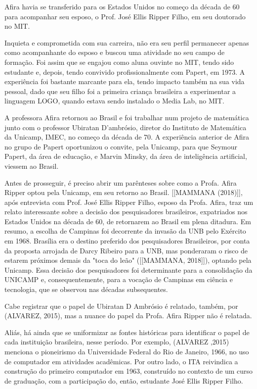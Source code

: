 Afira havia se transferido para os Estados Unidos no começo da década de 60 para acompanhar seu esposo, o Prof. José Ellis Ripper Filho, em seu doutorado no MIT.

Inquieta e comprometida com sua carreira, não era seu perfil permanecer apenas como acompanhante do esposo e buscou uma atividade no seu campo de formação. Foi assim que se engajou como aluna ouvinte no MIT, tendo sido estudante e, depois, tendo convivido profissionalmente com Papert, em 1973. A experiência foi bastante marcante para ela, tendo impacto também na sua vida pessoal, dado que seu filho foi a primeira criança brasileira a experimentar a linguagem LOGO, quando estava sendo instalado o Media Lab, no MIT.

A professora Afira retornou ao Brasil e foi trabalhar num projeto de matemática junto com o professor Ubiratan D’ambrósio, diretor do Instituto de Matemática da Unicamp, IMEC, no começo da década de 70. A experiência anterior de Afira no grupo de Papert oportunizou o convite, pela Unicamp, para que Seymour Papert, da área de educação, e Marvin Minsky, da área de inteligência artificial, viessem ao Brasil.

Antes de prosseguir, é preciso abrir um parênteses sobre como a Profa. Afira Ripper optou pela Unicamp, em seu retorno ao Brasil.  [[MAMMANA (2018)]], após entrevista com Prof. José Ellis Ripper Filho, esposo da Profa. Afira, traz um relato interessante sobre a decisão dos pesquisadores brasileiros, expatriados nos Estados Unidos na década de 60, de retornarem ao Brasil em plena ditadura. Em resumo, a escolha de Campinas foi decorrente da invasão da UNB pelo Exército em 1968. Brasília era o destino preferido dos pesquisadores Brasileiros, por conta da proposta arrojada de Darcy Ribeiro para a UNB, mas ponderaram o risco de estarem próximos demais da "toca do leão"  ([[MAMMANA, 2018]]), optando pela Unicamp. Essa decisão dos pesquisadores foi determinante para a consolidação da UNICAMP e, consequentemente, para a vocação de Campinas em ciência e tecnologia, que se observou nas décadas subsequentes.

Cabe registrar que o papel de Ubiratan D Ambrósio é relatado, também, por (ALVAREZ, 2015), mas a nuance do papel da Profa. Afira Ripper não é relatada.

Aliás, há ainda que se uniformizar as fontes históricas para identificar o papel de cada instituição brasileira, nesse período. Por exemplo, (ALVAREZ ,2015) menciona o pioneirismo da Universidade Federal do Rio de Janeiro, 1966, no uso de computador em atividades acadêmicas. Por outro lado, o ITA reivindica a construção do primeiro computador em 1963, construído no contexto de um curso de graduação, com a participação do, então, estudante José Ellis Ripper Filho.

